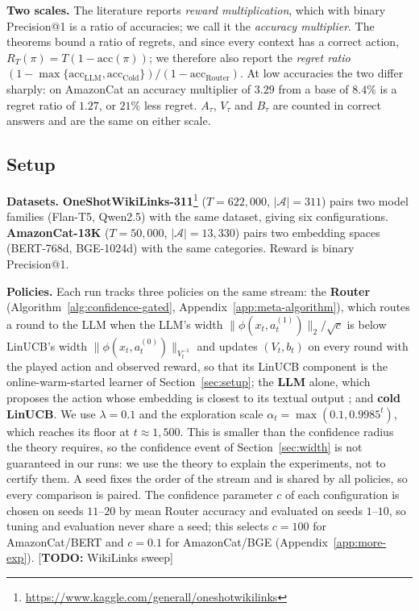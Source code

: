 \documentclass{article}
\theoremstyle{definition}
\theoremstyle{remark}
\theoremstyle{remark}
\newcommand{\todo}[1]{\textcolor{red!70!black}{[\textbf{TODO:} #1]}}
\begin{document}
\textbf{Two scales.} The literature reports \emph{reward multiplication},
which with binary Precision@1 is a ratio of accuracies; we call it the
\emph{accuracy multiplier}. The theorems bound a ratio of regrets, and since
every context has a correct action, $R_T(\pi)=T(1-\mathrm{acc}(\pi))$; we
therefore also report the \emph{regret ratio}
$(1-\max\{\mathrm{acc}_{\mathrm{LLM}},\mathrm{acc}_{\mathrm{Cold}}\})/(1-\mathrm{acc}_{\mathrm{Router}})$.
At low accuracies the two differ sharply: on AmazonCat an accuracy multiplier
of $3.29$ from a base of $8.4\%$ is a regret ratio of $1.27$, or $21\%$ less
regret. $A_\tau$, $V_\tau$ and $B_\tau$ are counted in correct answers and are
the same on either scale.

\subsection{Setup}
\label{sec:exp-setup}

\textbf{Datasets.} \textbf{OneShotWikiLinks-311}\footnote{\url{https://www.kaggle.com/generall/oneshotwikilinks}} ($T\!=\!622{,}000$,
$|\mathcal A|\!=\!311$) pairs two model families (Flan-T5, Qwen2.5) with the
same dataset, giving six configurations. \textbf{AmazonCat-13K}
\cite{bhatia2016extreme} ($T\!=\!50{,}000$, $|\mathcal A|\!=\!13{,}330$) pairs two embedding spaces
(BERT-768d, BGE-1024d) with the same categories. Reward is binary
Precision@1.

\textbf{Policies.} Each run tracks three policies on the same stream: the
\textbf{Router} (Algorithm~\ref{alg:confidence-gated},
Appendix~\ref{app:meta-algorithm}), which routes a round to the LLM when the
LLM's width $\|\phi(x_t,a_t^{(1)})\|_2/\sqrt c$ is below LinUCB's width
$\|\phi(x_t,a_t^{(0)})\|_{V_t^{-1}}$ and updates $(V_t,b_t)$ on every round
with the played action and observed reward, so that its LinUCB component is
the online-warm-started learner of Section~\ref{sec:setup}; the \textbf{LLM}
alone, which proposes the action whose embedding is closest to its textual
output \cite{chen2024llmdecision}; and \textbf{cold LinUCB}. We use
$\lambda=0.1$ and the exploration scale $\alpha_t=\max(0.1,0.9985^t)$, which
reaches its floor at $t\approx1{,}500$. This is smaller than the confidence
radius the theory requires, so the confidence event of
Section~\ref{sec:width} is not guaranteed in our runs: we use the theory to
explain the experiments, not to certify them. A seed fixes the order of the
stream and is shared by all policies, so every comparison is paired. The
confidence parameter $c$ of each configuration is chosen on seeds $11$--$20$
by mean Router accuracy and evaluated on seeds $1$--$10$, so tuning and
evaluation never share a seed; this selects $c=100$ for AmazonCat/BERT and
$c=0.1$ for AmazonCat/BGE (Appendix~\ref{app:more-exp}).
\todo{WikiLinks sweep}
\end{document}
